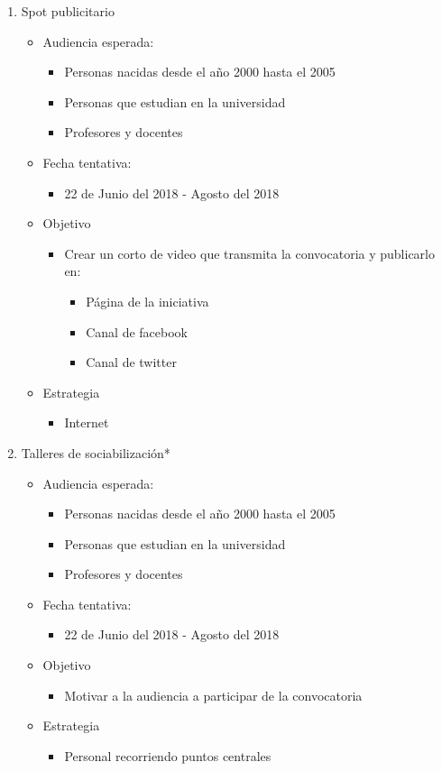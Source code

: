\documentclass{article}
\begin{document}
\begin{enumerate}
\item Spot publicitario 
\begin{itemize}
\item Audiencia esperada:
\begin{itemize}
\item Personas nacidas desde el año 2000 hasta el 2005
\item Personas que estudian en la universidad
\item Profesores y docentes
\end{itemize}
\item Fecha tentativa:
\begin{itemize}
\item 22 de Junio del 2018 - Agosto del 2018
\end{itemize}
\item Objetivo
\begin{itemize}
\item Crear un corto de video que transmita la convocatoria y publicarlo en:
\begin{itemize}
\item Página de la iniciativa 
\item Canal de facebook
\item Canal de twitter
\end{itemize}
\end{itemize}
\item Estrategia
\begin{itemize}
\item Internet
\end{itemize}
\end{itemize}

\item Talleres de sociabilización* 
\begin{itemize}
\item Audiencia esperada:
\begin{itemize}
\item Personas nacidas desde el año 2000 hasta el 2005
\item Personas que estudian en la universidad
\item Profesores y docentes
\end{itemize}
\item Fecha tentativa:
\begin{itemize}
\item 22 de Junio del 2018 - Agosto del 2018
\end{itemize}
\item Objetivo
\begin{itemize}
\item Motivar a la audiencia a participar de la convocatoria
\end{itemize}
\item Estrategia
\begin{itemize}
\item Personal recorriendo puntos centrales
\end{itemize}
\end{itemize}


\end{enumerate}
\end{document}
